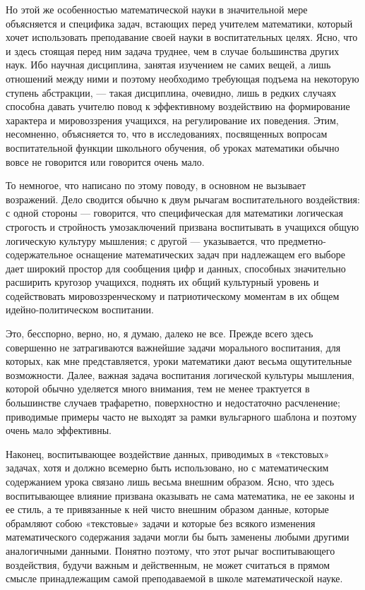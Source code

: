 \documentclass[12pt, a4paper, openany]{book}
\begin{document}
Но этой же особенностью математической науки в  значительной мере объясняется и специфика задач, встающих перед учителем математики, который хочет использовать преподавание своей науки в воспитательных целях. Ясно, что и здесь стоящая перед ним задача труднее, чем в случае большинства других наук. Ибо научная дисциплина,  занятая изучением не самих вещей, а лишь отношений между ними и поэтому необходимо требующая подъема на  некоторую ступень абстракции, — такая дисциплина, очевидно, лишь в редких случаях способна давать учителю повод к эффективному воздействию на формирование характера и мировоззрения учащихся, на регулирование их поведения. Этим, несомненно, объясняется то, что в исследованиях, посвященных вопросам воспитательной функции  школьного обучения, об уроках математики обычно вовсе не  говорится или говорится очень мало. 

То немногое, что написано по этому поводу, в основном не вызывает возражений. Дело сводится обычно к двум  рычагам воспитательного воздействия: с одной стороны — говорится, что специфическая для математики логическая строгость и стройность умозаключений призвана  воспитывать в учащихся общую логическую культуру мышления; с другой — указывается, что предметно-содержательное оснащение математических задач при надлежащем его выборе дает широкий простор для сообщения цифр и  данных, способных значительно расширить кругозор  учащихся, поднять их общий культурный уровень и содействовать мировоззренческому и патриотическому моментам в их общем идейно-политическом воспитании. 

Это, бесспорно, верно, но, я думаю, далеко не все. Прежде всего здесь совершенно не затрагиваются  важнейшие задачи морального воспитания, для которых, как мне представляется, уроки математики дают весьма  ощутительные возможности. Далее, важная задача воспитания логической культуры мышления, которой обычно уделяется много внимания, тем не менее трактуется в большинстве случаев трафаретно, поверхностно и недостаточно  расчленение; приводимые примеры часто не выходят за рамки вульгарного шаблона и поэтому очень мало эффективны. 

Наконец, воспитывающее воздействие данных,  приводимых в «текстовых» задачах, хотя и должно всемерно быть использовано, но с математическим содержанием урока связано лишь весьма внешним образом. Ясно, что здесь воспитывающее влияние призвана оказывать не сама  математика, не ее законы и ее стиль, а те привязанные к ней чисто внешним образом данные, которые обрамляют собою «текстовые» задачи и которые без всякого изменения математического содержания задачи могли бы быть  заменены любыми другими аналогичными данными. Понятно поэтому, что этот рычаг воспитывающего воздействия,  будучи важным и действенным, не может считаться в  прямом смысле принадлежащим самой преподаваемой в школе математической науке. 
\end{document}

